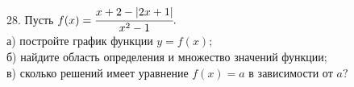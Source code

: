 28. Пусть $f(x)=\cfrac{x+2-|2x+1|}{x^2-1}.$\\
а) постройте график функции $y=f(x);$\\
б) найдите область определения и множество значений функции;\\
в) сколько решений имеет уравнение $f(x)=a$ в зависимости от $a?$\\
